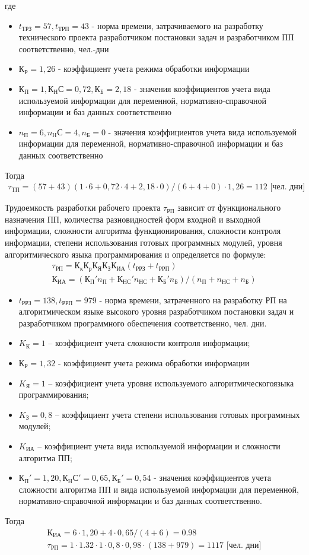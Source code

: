 \documentclass[a4paper,12pt]{report}
\numberwithin{equation}{section}
\begin{document}
где 
\begin{itemize}
  \item $t_{ТРЗ} = 57, t_{ТРП} = 43$ - норма времени, затрачиваемого на разработку технического проекта разработчиком постановки задач и разработчиком ПП соответственно, чел.-дни
  \item $К_Р = 1,26$ - коэффициент учета режима обработки информации
  \item $К_П = 1, К_НС = 0,72, К_Б = 2,18$ - значения коэффициентов учета вида используемой информации для переменной, нормативно-справочной информации и баз данных соответственно
  \item $n_П = 6, n_НС = 4, n_Б = 0$ - значения коэффициентов учета вида используемой информации для переменной, нормативно-справочной информации и баз данных соответственно
\end{itemize}
Тогда 
\begin{gather*}
	\tau_{ТП} = (57 + 43) (1 \cdot 6 + 0,72 \cdot 4 + 2,18 \cdot 0) / (6 + 4 + 0) \cdot 1,26 = 112 \text{ [чел. дни]}
\end{gather*}

Трудоемкость разработки рабочего проекта $\tau_{РП}$ зависит от
функционального назначения ПП, количества разновидностей форм входной
и выходной информации, сложности алгоритма функционирования,
сложности контроля информации, степени использования готовых
программных модулей, уровня алгоритмического языка программирования и
определяется по формуле:
\begin{gather*}
  \tau_{РП} = К_к К_р К_Я К_З К_{ИА} (t_{РРЗ} + t_{РРП})\\
  К_{ИА} = (К_П' n_П + К_{НС}' n_{НС} + К_Б' n_Б) / (n_П + n_{НС} + n_Б)
\end{gather*}
\begin{itemize}
  \item $t_{РРЗ} = 138, t_{РРП} = 979$ - норма времени, затраченного на разработку РП на алгоритмическом языке высокого уровня разработчиком постановки задач и разработчиком программного обеспечения соответственно, чел. дни.
  \item $K_К = 1$ – коэффициент учета сложности контроля информации;
  \item $К_Р = 1,32$ - коэффициент учета режима обработки информации
  \item $K_Я = 1$ – коэффициент учета уровня используемого алгоритмическогоязыка программирования;
  \item $K_З = 0,8$ – коэффициент учета степени использования готовых программных модулей;
  \item $K_{ИА}$ – коэффициент учета вида используемой информации и сложности алгоритма ПП;
  \item $К_П' = 1,20, К_НС' = 0,65, К_Б' = 0,54$ - значения коэффициентов учета сложности алгоритма ПП и вида используемой информации для переменной, нормативно-справочной информации и баз данных соответственно.
\end{itemize}
Тогда
\begin{gather*}
  К_{ИА} = 6 \cdot 1,20 + 4 \cdot 0,65 / (4 + 6) = 0.98 \\
  \tau_{РП} = 1 \cdot 1.32 \cdot 1 \cdot 0,8 \cdot 0,98 \cdot(138 + 979) = 1117 \text{ [чел. дни]}
\end{gather*}
\end{document}
